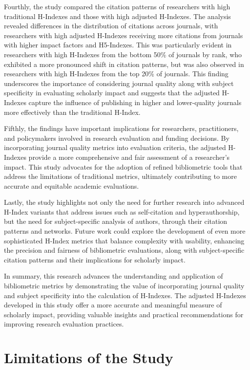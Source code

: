 Fourthly, the study compared the citation patterns of researchers with high
traditional H-Indexes and those with high adjusted H-Indexes. The analysis
revealed differences in the distribution of citations across journals, with
researchers with high adjusted H-Indexes receiving more citations from journals
with higher impact factors and H5-Indexes. This was particularly evident in
researchers with high H-Indexes from the bottom 50\% of journals by rank, who
exhibited a more pronounced shift in citation patterns, but was also observed
in researchers with high H-Indexes from the top 20\% of journals. This finding
underscores the importance of considering journal quality along with subject
specificity in evaluating scholarly impact and suggests that the adjusted
H-Indexes capture the influence of publishing in higher and lower-quality
journals more effectively than the traditional H-Index.

Fifthly, the findings have important implications for researchers,
practitioners, and policymakers involved in research evaluation and funding
decisions. By incorporating journal quality metrics into evaluation criteria,
the adjusted H-Indexes provide a more comprehensive and fair assessment of a
researcher's impact. This study advocates for the adoption of refined
bibliometric tools that address the limitations of traditional metrics,
ultimately contributing to more accurate and equitable academic evaluations.

Lastly, the study highlights not only the need for further research into
advanced H-Index variants that address issues such as self-citation and
hyperauthorship, but the need for subject-specific analysis of authors, through
their citation patterns and networks. Future work could explore the development
of even more sophisticated H-Index metrics that balance complexity with
usability, enhancing the precision and fairness of bibliometric evaluations,
along with subject-specific citation patterns and their implications for
scholarly impact.

In summary, this research advances the understanding and application of
bibliometric metrics by demonstrating the value of incorporating journal
quality and subject specificity into the calculation of H-Indexes. The adjusted
H-Indexes developed in this study offer a more accurate and meaningful measure
of scholarly impact, providing valuable insights and practical recommendations
for improving research evaluation practices.

\section{Limitations of the Study}

